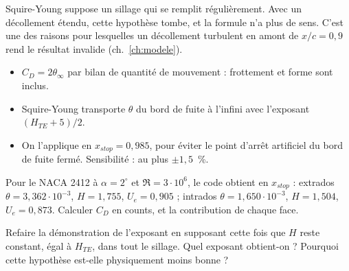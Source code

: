 \begin{piege}
Squire-Young suppose un sillage qui se remplit régulièrement. Avec un décollement étendu, cette hypothèse tombe, et la formule n'a plus de sens. C'est une des raisons pour lesquelles un décollement turbulent en amont de $x/c=0{,}9$ rend le résultat invalide (ch.~\ref{ch:modele}).
\end{piege}

\begin{resultat}
\begin{itemize}
\item $C_D=2\theta_\infty$ par bilan de quantité de mouvement : frottement et forme sont inclus.
\item Squire-Young transporte $\theta$ du bord de fuite à l'infini avec l'exposant $(H_{TE}+5)/2$.
\item On l'applique en $x_{stop}=0{,}985$, pour éviter le point d'arrêt artificiel du bord de fuite fermé. Sensibilité : au plus $\pm1{,}5$~\%.
\end{itemize}
\end{resultat}

\exercices
\begin{exercice}
Pour le NACA 2412 à $\alpha=2^\circ$ et $\Re=3\cdot10^6$, le code obtient en $x_{stop}$ : extrados $\theta=3{,}362\cdot10^{-3}$, $H=1{,}755$, $U_e=0{,}905$ ; intrados $\theta=1{,}650\cdot10^{-3}$, $H=1{,}504$, $U_e=0{,}873$. Calculer $C_D$ en counts, et la contribution de chaque face.
\end{exercice}
\begin{exercice}
Refaire la démonstration de l'exposant en supposant cette fois que $H$ reste constant, égal à $H_{TE}$, dans tout le sillage. Quel exposant obtient-on ? Pourquoi cette hypothèse est-elle physiquement moins bonne ?
\end{exercice}
